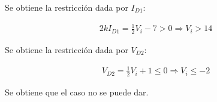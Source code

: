 Se obtiene la restricción dada por $I_{D1}$:

\begin{align*}
  2k I_{D1} = \frac{1}{2} V_i - 7 > 0
  \Rightarrow
  V_i > 14
\end{align*}

Se obtiene la restricción dada por $V_{D2}$:

\begin{align*}
  V_{D2} = \frac{1}{2} V_i + 1 \leq 0
  \Rightarrow
  V_i \leq -2
\end{align*}

Se obtiene que el caso no se puede dar.
